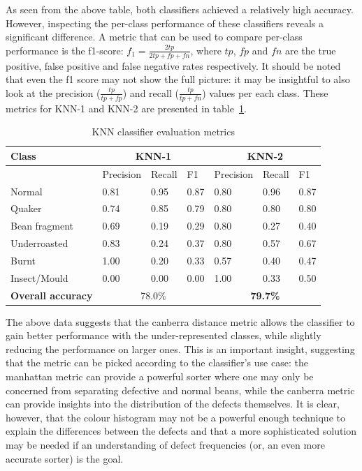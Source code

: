 As seen from the above table, both classifiers achieved a relatively high accuracy.
However, inspecting the per-class performance of these classifiers reveals a significant difference.
A metric that can be used to compare per-class performance is the f1-score:
$f_1 = \frac{2tp}{2tp + fp + fn}$, where $tp$, $fp$ and $fn$ are the true positive, false positive and false negative rates respectively.
It should be noted that even the f1 score may not show the full picture: it may be insightful to also look at the precision
($\frac{tp}{tp + fp}$) and recall ($\frac{tp}{tp + fn}$) values per each class.
These metrics for KNN-1 and KNN-2 are presented in table~\ref{tab:knnScores}.
\begin{table}
    \centering
    \begin{tabular}{*7l}
        \toprule
        \textbf{Class} & \multicolumn{3}{c}{KNN-1} & \multicolumn{3}{c}{KNN-2} \\
        \midrule
        {}            & Precision & Recall & F1   & Precision & Recall & F1   \\
        Normal        & 0.81      & 0.95   & 0.87 & 0.80      & 0.96   & 0.87 \\
        Quaker        & 0.74      & 0.85   & 0.79 & 0.80      & 0.80   & 0.80 \\
        Bean fragment & 0.69      & 0.19   & 0.29 & 0.80      & 0.27   & 0.40 \\
        Underroasted  & 0.83      & 0.24   & 0.37 & 0.80      & 0.57   & 0.67 \\
        Burnt         & 1.00      & 0.20   & 0.33 & 0.57      & 0.40   & 0.47 \\
        Insect/Mould  & 0.00      & 0.00   & 0.00 & 1.00      & 0.33   & 0.50 \\
        \midrule
        \textbf{Overall accuracy} & \multicolumn{3}{c}{78.0\%} & \multicolumn{3}{c}{\textbf{79.7\%}} \\
        \bottomrule
    \end{tabular}
    \caption{KNN classifier evaluation metrics}
    \label{tab:knnScores}
\end{table}

The above data suggests that the canberra distance metric allows the classifier to gain better
performance with the under-represented classes, while slightly reducing the performance on larger ones.
This is an important insight, suggesting that the metric can be picked according to the classifier's use case:
the manhattan metric can provide a powerful sorter where one may only be concerned from separating defective and normal beans,
while the canberra metric can provide insights into the distribution of the defects themselves.
It is clear, however, that the colour histogram may not be a powerful enough technique to explain the differences between
the defects and that a more sophisticated solution may be needed if an understanding of defect frequencies (or, an even more accurate sorter)
is the goal.


